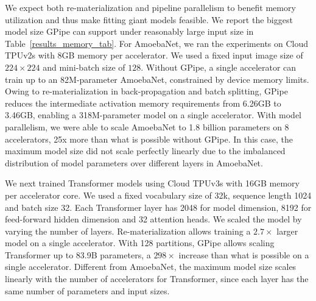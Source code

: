 \documentclass{article}
\def\codename{GPipe}
\begin{document}
We expect both re-materialization and pipeline parallelism to benefit memory utilization and thus make fitting giant models feasible. We report the biggest model size \codename{} can support under reasonably large input size in Table~\ref{results_memory_tab}. For AmoebaNet, we ran the experiments on Cloud TPUv2s with 8GB memory per accelerator. We used a fixed input image size of $224\times224$ and mini-batch size of $128$.  Without \codename{}, a single accelerator can train up to an 82M-parameter AmoebaNet, constrained by device memory limits. Owing to re-materialization in back-propagation and batch splitting, \codename{} reduces the intermediate activation memory requirements from 6.26GB to 3.46GB, 
enabling a 318M-parameter model on a single accelerator.  With model parallelism, we were able to scale AmoebaNet to 1.8 billion parameters on 8 accelerators, 25x more than what is possible without \codename{}. In this case, the maximum model size did not scale perfectly linearly due to the imbalanced distribution of model parameters over different layers in AmoebaNet.


We next trained Transformer models using Cloud TPUv3s with 16GB memory per accelerator core. We used a fixed vocabulary size of 32k, sequence length 1024 and batch size 32. Each Transformer layer has 2048 for model dimension, 8192 for feed-forward hidden dimension and 32 attention heads. We scaled the model by varying the number of layers. Re-materialization allows training a $2.7\times$ larger model on a single accelerator. With 128 partitions, \codename{} allows scaling Transformer up to 83.9B parameters, a $298\times$ increase than what is possible on a single accelerator. Different from AmoebaNet, the maximum model size scales linearly with the number of accelerators for Transformer, since each layer has the same number of parameters and input sizes. 
\end{document}
